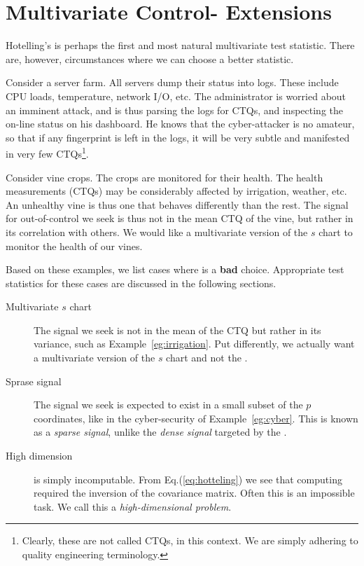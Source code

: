 \section[Multivariate extensions]{Multivariate Control- Extensions}

Hotelling's \tsq is perhaps the first and most natural multivariate test statistic.
There are, however, circumstances where we can choose a better statistic.


\begin{example}
\label{eg:cyber}
Consider a server farm. 
All servers dump their status into logs. These include CPU loads, temperature, network I/O, etc.
The administrator is worried about an imminent attack, and is thus parsing the logs for CTQs, and inspecting the on-line status on his dashboard.
He knows that the cyber-attacker is no amateur, so that if any fingerprint is left in the logs, it will be very subtle and manifested in very few CTQs\footnote{Clearly, these are not called CTQs, in this context. We are simply adhering to quality engineering terminology.}.
\end{example}


\begin{example}
\label{eg:irrigation}
Consider vine crops.
The crops are monitored for their health.
The health measurements (CTQs) may be considerably affected by irrigation, weather, etc.
An unhealthy vine is thus one that behaves differently than the rest. 
The signal for out-of-control we seek is thus not in the mean CTQ of the vine, but rather in its correlation with others. 
We would like a multivariate version of the $s$ chart to monitor the health of our vines.  
\end{example}


Based on these examples, we list cases where \tsq is a \textbf{bad} choice. Appropriate test statistics for these cases are discussed in the following sections.
\begin{description}

\item [Multivariate $s$ chart] The signal we seek is not in the mean of the CTQ but rather in its variance, such as Example~\ref{eg:irrigation}. Put differently, we actually want a multivariate version of the $s$ chart and not the \barxChart. 

\item [Sprase signal] The signal we seek is expected to exist in a small subset of the $p$ coordinates, like in the cyber-security of Example~\ref{eg:cyber}. This is known as a \emph{sparse signal}, unlike the \emph{dense signal} targeted by the \tsq. 

\item [High dimension] \tsq is simply incomputable. From Eq.(\ref{eq:hotteling}) we see that computing \tsq required the inversion of the covariance matrix. Often this is an impossible task. We call this a \emph{high-dimensional problem}.
\end{description}




